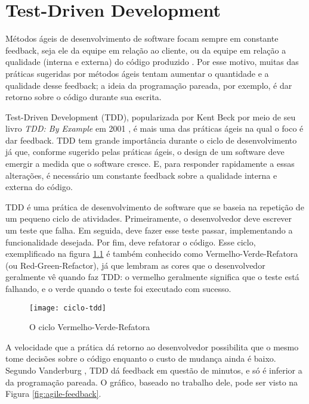 \chapter{Test-Driven Development}
\label{cap:tdd}

Métodos ágeis de desenvolvimento de software focam sempre em constante
feedback, seja ele da equipe em relação ao cliente, ou da equipe em relação a
qualidade (interna e externa) do código produzido \cite{AgileManifesto}. Por
esse motivo, muitas das práticas sugeridas por métodos ágeis tentam aumentar o 
quantidade e a qualidade desse feedback; a ideia da programação pareada, por
exemplo, é dar retorno sobre o código durante sua escrita.

Test-Driven Development (TDD), popularizada por Kent Beck por meio de seu livro
\textit{TDD: By Example} em 2001 \cite{TDDByExample}, é mais uma das práticas
ágeis na qual o foco é dar feedback. TDD tem grande importância durante o ciclo
de desenvolvimento já que, conforme sugerido pelas práticas ágeis, o design de um
software deve emergir a medida que o software cresce. E, para responder
rapidamente a essas alterações, é necessário um constante feedback sobre a
qualidade interna e externa do código.

TDD é uma prática de desenvolvimento de software que se baseia na repetição de
um pequeno ciclo de atividades. Primeiramente, o desenvolvedor deve escrever um
teste que falha. Em seguida, deve fazer esse teste passar, implementando a
funcionalidade desejada. Por fim, deve refatorar o código. Esse ciclo,
exemplificado na figura \ref{fig:red-green-refactor} é também conhecido como 
Vermelho-Verde-Refatora (ou Red-Green-Refactor), já que lembram as cores que o 
desenvolvedor geralmente vê quando faz TDD: o vermelho geralmente significa que
o teste está falhando, e o verde quando o teste foi executado com sucesso.

\begin{figure}
  \centering
  \texttt{[image: ciclo-tdd]}
  \caption{O ciclo Vermelho-Verde-Refatora}
  \label{fig:red-green-refactor}
\end{figure}

A velocidade que a prática dá retorno ao desenvolvedor possibilita que o mesmo
tome decisões sobre o código enquanto o custo de mudança ainda é
baixo. Segundo Vanderburg \cite{vanderburg}, TDD dá feedback em questão de
minutos, e só é inferior a da programação pareada. O gráfico,
baseado no trabalho dele, pode ser visto na Figura
\ref{fig:agile-feedback}.

